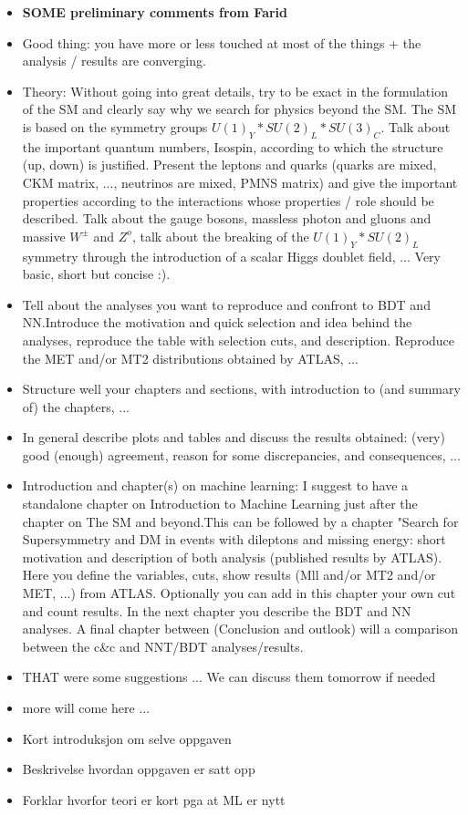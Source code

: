 \begin{itemize}
    \item {\bf SOME preliminary comments from Farid }
    \item Good thing: you have more or less touched at most of the things + the analysis / results are converging.
    \item Theory: Without going into great details, try to be exact in the formulation of the SM and clearly say why we search for physics beyond the SM. The SM is based on the symmetry groups $U(1)_Y * SU(2)_L * SU(3)_C$. Talk about the important quantum numbers, Isospin, according to which the structure (up, down) is justified. Present the leptons and quarks (quarks are mixed, CKM matrix, ..., neutrinos are mixed, PMNS matrix) and give the important properties according to the interactions whose properties / role should be described. Talk about the gauge bosons, massless photon and gluons and massive $W^±$ and $Z^o$, talk about the breaking of the $U(1)_Y * SU(2)_L $ symmetry through the introduction of a scalar Higgs doublet field, ...  Very basic, short but concise :).   
    \item Tell about the analyses you want to reproduce and confront to BDT and NN.Introduce the motivation and quick selection and idea behind the analyses, reproduce the table with selection cuts, and description. Reproduce the MET and/or MT2 distributions obtained by ATLAS, ... 
    \item Structure well your chapters and sections, with introduction to (and summary of) the chapters, ...
    \item In general describe plots and tables and discuss the results obtained: (very) good (enough) agreement, reason for some discrepancies, and consequences, ... 
    \item Introduction and chapter(s) on machine learning: I suggest to have a standalone chapter on Introduction to Machine Learning just after the chapter on The SM and beyond.This can be followed by a chapter "Search for Supersymmetry and DM in events with dileptons and missing energy: short motivation and description of both analysis (published results by ATLAS). Here you define the variables, cuts, show results (Mll and/or MT2 and/or MET, ...) from ATLAS. Optionally you can add in this chapter your own cut and count results. In the next chapter you describe the BDT and NN analyses. A final chapter between (Conclusion and outlook) will a comparison between the c&c and NNT/BDT analyses/results. 
    \item THAT were some suggestions ... We can discuss them tomorrow if needed
    \item more will come here ... 
\end{itemize}





\begin{itemize}
    \item Kort introduksjon om selve oppgaven
    \item Beskrivelse hvordan oppgaven er satt opp
    \item Forklar hvorfor teori er kort pga at ML er nytt
\end{itemize}